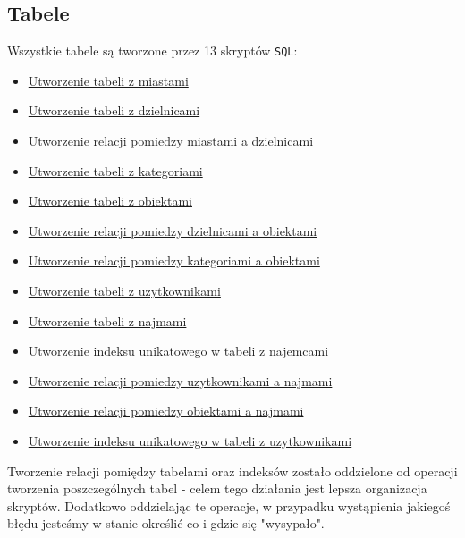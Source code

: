 \subsection{Tabele}

Wszystkie tabele są tworzone przez 13 skryptów \texttt{SQL}:
\begin{itemize}
	\item \href{run:Sources/SQL/1. Tabele/001_Utworzenie_tabeli_z_miastami.sql}{Utworzenie tabeli z miastami}
	\item \href{run:Sources/SQL/1. Tabele/002_Utworzenie_tabeli_z_dzielnicami.sql}{Utworzenie tabeli z dzielnicami}
	\item \href{run:Sources/SQL/1. Tabele/003_Utworzenie_relacji_pomiedzy_miastami_a_dzielnicami.sql}{Utworzenie relacji pomiedzy miastami a dzielnicami}
	\item \href{run:Sources/SQL/1. Tabele/004_Utworzenie_tabeli_z_kategoriami.sql}{Utworzenie tabeli z kategoriami}
	\item \href{run:Sources/SQL/1. Tabele/005_Utworzenie_tabeli_z_obiektami.sql}{Utworzenie tabeli z obiektami}
	\item \href{run:Sources/SQL/1. Tabele/006_Utworzenie_relacji_pomiedzy_dzielnicami_a_obiektami.sql}{Utworzenie relacji pomiedzy dzielnicami a obiektami}
	\item \href{run:Sources/SQL/1. Tabele/007_Utworzenie_relacji_pomiedzy_kategoriami_a_obiektami.sql}{Utworzenie relacji pomiedzy kategoriami a obiektami}
	\item \href{run:Sources/SQL/1. Tabele/008_Utworzenie_tabeli_z_uzytkownikami.sql}{Utworzenie tabeli z uzytkownikami}
	\item \href{run:Sources/SQL/1. Tabele/009_Utworzenie_tabeli_z_najmami.sql}{Utworzenie tabeli z najmami}
	\item \href{run:Sources/SQL/1. Tabele/010_Utworzenie_indeksu_unikatowego_w_tabeli_z_najemcami.sql}{Utworzenie indeksu unikatowego w tabeli z najemcami}
	\item \href{run:Sources/SQL/1. Tabele/011_Utworzenie_relacji_pomiedzy_uzytkownikami_a_najmami.sql}{Utworzenie relacji pomiedzy uzytkownikami a najmami}
	\item \href{run:Sources/SQL/1. Tabele/012_Utworzenie_relacji_pomiedzy_obiektami_a_najmami.sql}{Utworzenie relacji pomiedzy obiektami a najmami}
	\item \href{run:Sources/SQL/1. Tabele/013_Utworzenie_indeksu_unikatowego_w_tabeli_z_uzytkownikami}{Utworzenie indeksu unikatowego w tabeli z uzytkownikami}
\end{itemize}

Tworzenie relacji pomiędzy tabelami oraz indeksów zostało oddzielone od operacji tworzenia poszczególnych tabel - celem tego działania jest lepsza organizacja skryptów. Dodatkowo oddzielając te operacje, w przypadku wystąpienia jakiegoś błędu jesteśmy w stanie określić co i gdzie się "wysypało".